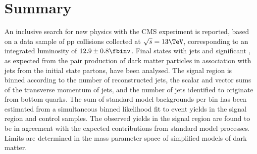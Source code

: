 \section{Summary}
\label{sec:summary}

An inclusive search for new physics with the CMS experiment is
reported, based on a data sample of pp collisions collected at
$\sqrt{s} = 13\TeV$, corresponding to an integrated luminosity of $12.9
\pm 0.8 \fbinv$. Final states with jets and significant \ETmiss, as
expected from the pair production of dark matter particles in association with jets from the initial state partons,
have been analysed. The signal region is binned according to the
number of reconstructed jets, the scalar and vector sums of the
transverse momentum of jets, and the number of jets identified to
originate from bottom quarks. The sum of standard model backgrounds
per bin has been estimated from a simultaneous binned likelihood fit
to event yields in the signal region and control samples. The observed
yields in the signal region are found to be in agreement with the
expected contributions from standard model processes. Limits are determined 
in the mass parameter space of simplified models of dark matter.

